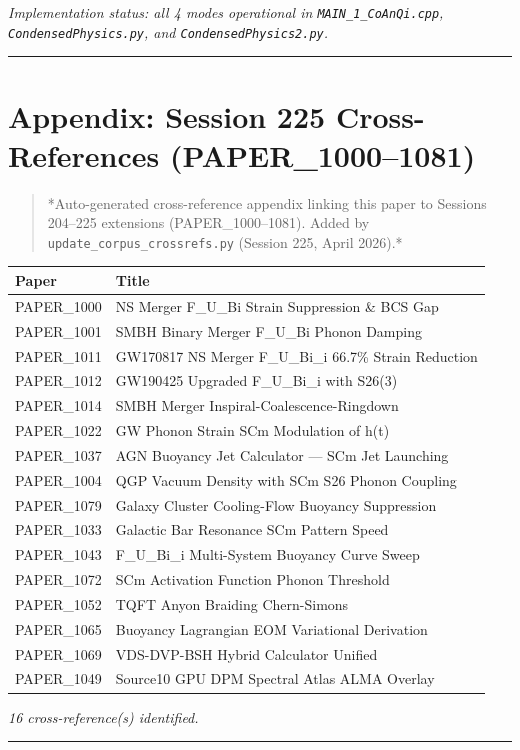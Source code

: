 \documentclass[12pt,a4paper]{article}
\begin{document}
\emph{Implementation status: all 4 modes operational in \texttt{MAIN\_{1\_CoAnQi}.cpp}, \texttt{CondensedPhysics.py}, and \texttt{CondensedPhysics2.py}.}

\medskip\hrule\medskip

\section{Appendix: Session 225 Cross-References (PAPER\_1000--1081)}

\begin{quote}
*Auto-generated cross-reference appendix linking this paper to
Sessions 204--225 extensions (PAPER\_1000--1081). Added by
\texttt{update\_{corpus\_crossrefs}.py} (Session 225, April 2026).*
\end{quote}

\begin{table}[H]
\centering
\small
\begin{tabularx}{\linewidth}{@{}>{\raggedright\arraybackslash}X>{\raggedright\arraybackslash}X@{}}
\toprule
Paper & Title \tabularnewline
\midrule
PAPER\_1000 & NS Merger F\_{U\_Bi} Strain Suppression \& BCS Gap \tabularnewline
PAPER\_1001 & SMBH Binary Merger F\_{U\_Bi} Phonon Damping \tabularnewline
PAPER\_1011 & GW170817 NS Merger F\_{U\_Bi\_i} 66.7\% Strain Reduction \tabularnewline
PAPER\_1012 & GW190425 Upgraded F\_{U\_Bi\_i} with S26(3) \tabularnewline
PAPER\_1014 & SMBH Merger Inspiral-Coalescence-Ringdown \tabularnewline
PAPER\_1022 & GW Phonon Strain SCm Modulation of h(t) \tabularnewline
PAPER\_1037 & AGN Buoyancy Jet Calculator --- SCm Jet Launching \tabularnewline
PAPER\_1004 & QGP Vacuum Density with SCm S26 Phonon Coupling \tabularnewline
PAPER\_1079 & Galaxy Cluster Cooling-Flow Buoyancy Suppression \tabularnewline
PAPER\_1033 & Galactic Bar Resonance SCm Pattern Speed \tabularnewline
PAPER\_1043 & F\_{U\_Bi\_i} Multi-System Buoyancy Curve Sweep \tabularnewline
PAPER\_1072 & SCm Activation Function Phonon Threshold \tabularnewline
PAPER\_1052 & TQFT Anyon Braiding Chern-Simons \tabularnewline
PAPER\_1065 & Buoyancy Lagrangian EOM Variational Derivation \tabularnewline
PAPER\_1069 & VDS-DVP-BSH Hybrid Calculator Unified \tabularnewline
PAPER\_1049 & Source10 GPU DPM Spectral Atlas ALMA Overlay \tabularnewline
\bottomrule
\end{tabularx}
\end{table}

\emph{16 cross-reference(s) identified.}

\medskip\hrule\medskip
\end{document}

